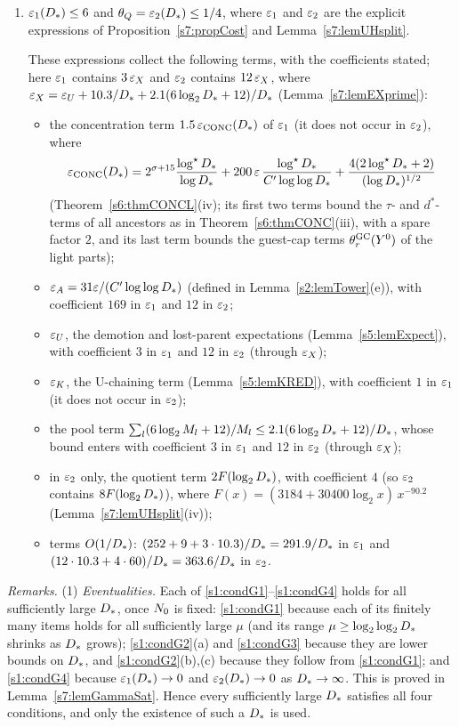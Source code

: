 \begin{condition}
\begin{enumerate}
\item[\Gc{4}] $\varepsilon_{1}(D_{*})\le6$ and
$\theta_{Q}=\varepsilon_{2}(D_{*})\le1/4$, where $\varepsilon_{1}$ and $\varepsilon_{2}$ are the explicit
expressions of Proposition~\ref{s7:propCost} and Lemma~\ref{s7:lemUHsplit}.

These expressions collect the following terms, with the coefficients stated;
here $\varepsilon_{1}$ contains $3\,\varepsilon_{X}$ and $\varepsilon_{2}$ contains $12\,\varepsilon_{X}$, where
$\varepsilon_{X}=\varepsilon_{U}+10.3/D_{*}+2.1(6\log_2D_{*}+12)/D_{*}$
(Lemma~\ref{s7:lemEXprime}):
\begin{itemize}
\item the concentration term $1.5\,\varepsilon_{\mathrm{CONC}}(D_{*})$ of $\varepsilon_{1}$ (it does
not occur in $\varepsilon_{2}$), where
\[
\varepsilon_{\mathrm{CONC}}(D_{*})=2^{\sigma+15}\frac{\log^{\star}D_{*}}{\log D_{*}}
+200\,\varepsilon\,\frac{\log^{\star}D_{*}}{C'\log\log D_{*}}
+\frac{4(2\log^{\star}D_{*}+2)}{(\log D_{*})^{1/2}}
\]
(Theorem~\ref{s6:thmCONCL}(iv); its first two terms bound the $\tau$- and
$d^*$-terms of all ancestors as in Theorem~\ref{s6:thmCONC}(iii), with a spare
factor $2$, and its last term bounds the guest-cap terms $\theta^{\mathrm{GC}}_r(Y^0)$ of the
light parts);
\item $\varepsilon_{A}=31\varepsilon/(C'\log\log D_{*})$ (defined in
Lemma~\ref{s2:lemTower}(e)), with coefficient $169$ in $\varepsilon_{1}$ and $12$ in
$\varepsilon_{2}$;
\item $\varepsilon_{U}$, the demotion and lost-parent expectations
(Lemma~\ref{s5:lemExpect}), with coefficient $3$ in $\varepsilon_{1}$ and $12$ in
$\varepsilon_{2}$ (through $\varepsilon_{X}$);
\item $\varepsilon_{K}$, the U-chaining term (Lemma~\ref{s5:lemKRED}), with
coefficient $1$ in $\varepsilon_{1}$ (it does not occur in $\varepsilon_{2}$);
\item the pool term
$\sum_l(6\log_2M_l+12)/M_l\le2.1(6\log_2D_{*}+12)/D_{*}$, whose bound
enters with coefficient $3$ in $\varepsilon_{1}$ and $12$ in $\varepsilon_{2}$ (through
$\varepsilon_{X}$);
\item in $\varepsilon_{2}$ only, the quotient term $2F(\log_2D_{*})$, with
coefficient $4$ (so $\varepsilon_{2}$ contains $8F(\log_2D_{*})$), where
$F(x)=(3184+30400\log_2x)\,x^{-90.2}$ (Lemma~\ref{s7:lemUHsplit}(iv));
\item terms $O(1/D_{*})$: $(252+9+3\cdot10.3)/D_{*}=291.9/D_{*}$ in
$\varepsilon_{1}$ and $(12\cdot10.3+4\cdot60)/D_{*}=363.6/D_{*}$ in $\varepsilon_{2}$.
\end{itemize}
\end{enumerate}

\emph{Remarks.} (1) \emph{Eventualities.} Each of
\ref{s1:condG1}--\ref{s1:condG4} holds for all sufficiently large $D_{*}$, once
$N_{0}$ is fixed: \ref{s1:condG1} because each of its finitely many items holds
for all sufficiently large $\mu$ (and its range $\mu\ge\log_2\log_2D_{*}$
shrinks as $D_{*}$ grows); \ref{s1:condG2}(a) and \ref{s1:condG3} because they
are lower bounds on $D_{*}$, and \ref{s1:condG2}(b),(c) because they follow
from \ref{s1:condG1}; and \ref{s1:condG4} because
$\varepsilon_{1}(D_{*})\to0$ and $\varepsilon_{2}(D_{*})\to0$ as $D_{*}\to\infty$. This is
proved in Lemma~\ref{s7:lemGammaSat}. Hence every sufficiently large $D_{*}$
satisfies all four conditions, and only the existence of such a $D_{*}$ is
used.


\end{condition}
